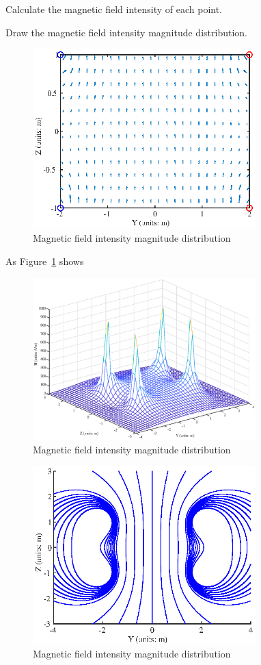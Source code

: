 \documentclass[10pt, journal, final]{IEEEtran}
\begin{document}
Calculate the magnetic field intensity of each point.




Draw the magnetic field intensity magnitude distribution.


\begin{figure}[htbp]
    \centering
    \includegraphics[width = 3.4in]{figures/work1.1.eps}
    \caption{Magnetic field intensity magnitude distribution}
    \label{fig:1.1}
\end{figure}

As Figure~\ref{fig:1.1} shows

\begin{figure}[htbp]
    \centering
    \includegraphics[width = 3.4in]{figures/work1.2.eps}
    \caption{Magnetic field intensity magnitude distribution}
    \label{fig:1.2}
\end{figure}

\begin{figure}[htbp]
    \centering
    \includegraphics[width = 3.4in]{figures/work1.3.eps}
    \caption{Magnetic field intensity magnitude distribution}
    \label{fig:1.3}
\end{figure}
\end{document}
